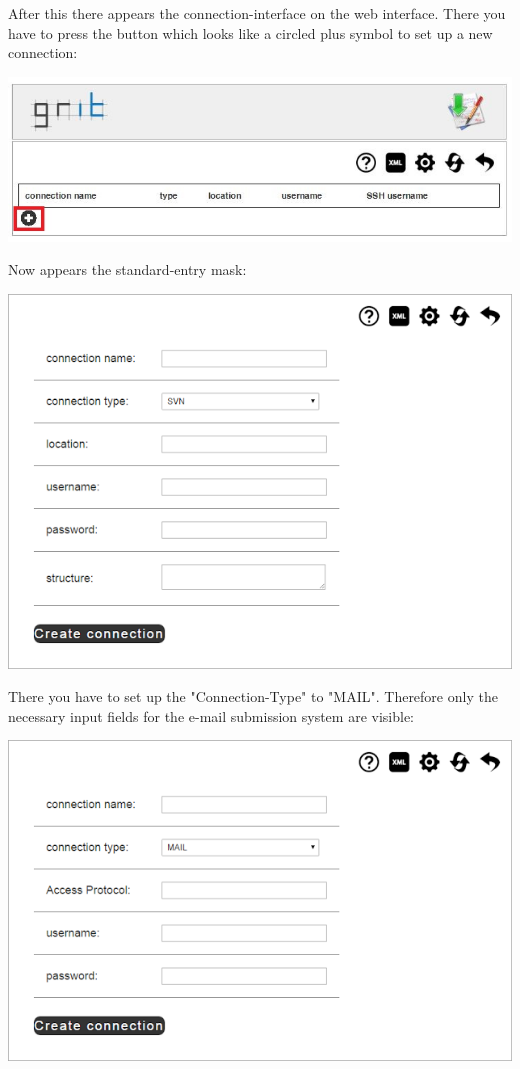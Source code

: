 \documentclass[10pt,a4paper, titlepage, toc=idx]{scrreprt}
\theoremstyle{definition}
\theoremstyle{plain}
\begin{document}
After this there appears the connection-interface on the web interface. There you have to press the button which looks like a circled plus symbol to set up a new connection:
\begin{center}
\includegraphics[scale=0.55]{pictures/connection.JPG} 
\end{center}

Now appears the standard-entry mask:
\begin{center}
\includegraphics[scale=0.55]{pictures/createNewConnectionSvn.png} 
\end{center}

There you have to set up the "Connection-Type" to "MAIL". Therefore only the necessary input fields for the e-mail submission system are visible:
\begin{center}
\includegraphics[scale=0.55]{pictures/createNewConnectionMail.png} 
\end{center}
\end{document}
